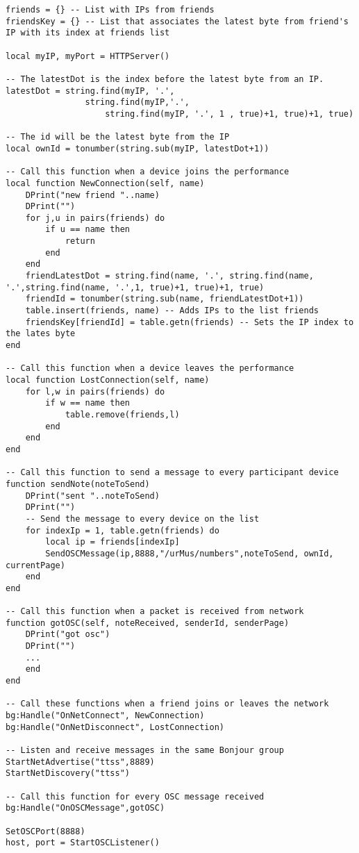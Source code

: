 \begin{footnotesize}
\lstset{language=Java, caption=Example of Lua code used at urMus platform for Multicasting in LAN, captionpos=b, label=urMusLuaMulticast, numbers=none, numberstyle=\scriptsize}
\begin{lstlisting}[frame=single]
friends = {} -- List with IPs from friends
friendsKey = {} -- List that associates the latest byte from friend's IP with its index at friends list

local myIP, myPort = HTTPServer()

-- The latestDot is the index before the latest byte from an IP.
latestDot = string.find(myIP, '.', 
				string.find(myIP,'.',
					string.find(myIP, '.', 1 , true)+1, true)+1, true)

-- The id will be the latest byte from the IP
local ownId = tonumber(string.sub(myIP, latestDot+1))

-- Call this function when a device joins the performance
local function NewConnection(self, name)
	DPrint("new friend "..name)
	DPrint("")
	for j,u in pairs(friends) do
		if u == name then
			return
		end
	end
	friendLatestDot = string.find(name, '.', string.find(name, '.',string.find(name, '.',1, true)+1, true)+1, true)
	friendId = tonumber(string.sub(name, friendLatestDot+1))
	table.insert(friends, name) -- Adds IPs to the list friends
	friendsKey[friendId] = table.getn(friends) -- Sets the IP index to the lates byte
end

-- Call this function when a device leaves the performance
local function LostConnection(self, name)
	for l,w in pairs(friends) do
		if w == name then
			table.remove(friends,l)
		end
	end
end

-- Call this function to send a message to every participant device
function sendNote(noteToSend)
	DPrint("sent "..noteToSend)
	DPrint("")
	-- Send the message to every device on the list
	for indexIp = 1, table.getn(friends) do
		local ip = friends[indexIp]
		SendOSCMessage(ip,8888,"/urMus/numbers",noteToSend, ownId, currentPage)
	end
end

-- Call this function when a packet is received from network
function gotOSC(self, noteReceived, senderId, senderPage)
	DPrint("got osc")
	DPrint("")
	...
	end
end

-- Call these functions when a friend joins or leaves the network
bg:Handle("OnNetConnect", NewConnection)
bg:Handle("OnNetDisconnect", LostConnection)

-- Listen and receive messages in the same Bonjour group
StartNetAdvertise("ttss",8889)
StartNetDiscovery("ttss")

-- Call this function for every OSC message received
bg:Handle("OnOSCMessage",gotOSC)

SetOSCPort(8888)
host, port = StartOSCListener()
\end{lstlisting}
\end{footnotesize}

